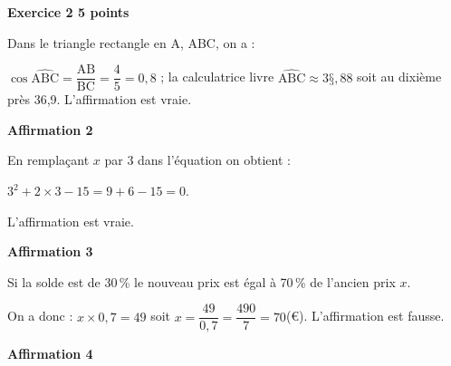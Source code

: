 \textbf{Exercice 2 \hfill 5 points}

\medskip

%

%
Dans le triangle rectangle en A, ABC, on  a :

$\cos \widehat{\text{ABC}} = \dfrac{\text{AB}}{\text{BC}} = \dfrac{4}{5} = 0,8$ ; la calculatrice livre  $\widehat{\text{ABC}} \approx 3§,88$ soit au dixième près 36,9\degres. L’affirmation est vraie.
 
\medskip

\textbf{Affirmation 2}


En remplaçant $x$ par $3$ dans l’équation on obtient :

$3^2 + 2 \times 3 - 15 = 9 + 6 - 15 = 0$.

L’affirmation est vraie.

\medskip

\textbf{Affirmation 3}

Si la solde est de 30\,\% le nouveau prix est égal à 70\,\% de l’ancien prix $x$.

On a donc : $x \times 0,7 = 49$ soit $x = \dfrac{49}{0,7} = \dfrac{490}{7} = 70$(\euro). L’affirmation est fausse.
\medskip

\textbf{Affirmation 4}

